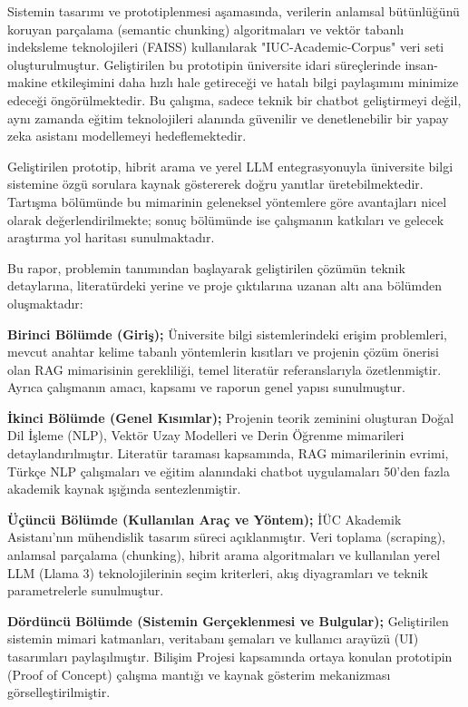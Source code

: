 \documentclass[12pt,a4paper]{report}
\begin{document}
Sistemin tasarımı ve prototiplenmesi aşamasında, verilerin anlamsal bütünlüğünü koruyan parçalama (semantic chunking) algoritmaları ve vektör tabanlı indeksleme teknolojileri (FAISS) kullanılarak "IUC-Academic-Corpus" veri seti oluşturulmuştur. Geliştirilen bu prototipin üniversite idari süreçlerinde insan-makine etkileşimini daha hızlı hale getireceği ve hatalı bilgi paylaşımını minimize edeceği öngörülmektedir. Bu çalışma, sadece teknik bir chatbot geliştirmeyi değil, aynı zamanda eğitim teknolojileri alanında güvenilir ve denetlenebilir bir yapay zeka asistanı modellemeyi hedeflemektedir.

Geliştirilen prototip, hibrit arama ve yerel LLM entegrasyonuyla üniversite bilgi sistemine özgü sorulara kaynak göstererek doğru yanıtlar üretebilmektedir. Tartışma bölümünde bu mimarinin geleneksel yöntemlere göre avantajları nicel olarak değerlendirilmekte; sonuç bölümünde ise çalışmanın katkıları ve gelecek araştırma yol haritası sunulmaktadır.

Bu rapor, problemin tanımından başlayarak geliştirilen çözümün teknik detaylarına, literatürdeki yerine ve proje çıktılarına uzanan altı ana bölümden oluşmaktadır:

\textbf{Birinci Bölümde (Giriş);} Üniversite bilgi sistemlerindeki erişim problemleri, mevcut anahtar kelime tabanlı yöntemlerin kısıtları ve projenin çözüm önerisi olan RAG mimarisinin gerekliliği, temel literatür referanslarıyla özetlenmiştir. Ayrıca çalışmanın amacı, kapsamı ve raporun genel yapısı sunulmuştur.

\textbf{İkinci Bölümde (Genel Kısımlar);} Projenin teorik zeminini oluşturan Doğal Dil İşleme (NLP), Vektör Uzay Modelleri ve Derin Öğrenme mimarileri detaylandırılmıştır. Literatür taraması kapsamında, RAG mimarilerinin evrimi, Türkçe NLP çalışmaları ve eğitim alanındaki chatbot uygulamaları 50'den fazla akademik kaynak ışığında sentezlenmiştir.

\textbf{Üçüncü Bölümde (Kullanılan Araç ve Yöntem);} İÜC Akademik Asistanı'nın mühendislik tasarım süreci açıklanmıştır. Veri toplama (scraping), anlamsal parçalama (chunking), hibrit arama algoritmaları ve kullanılan yerel LLM (Llama 3) teknolojilerinin seçim kriterleri, akış diyagramları ve teknik parametrelerle sunulmuştur.

\textbf{Dördüncü Bölümde (Sistemin Gerçeklenmesi ve Bulgular);} Geliştirilen sistemin mimari katmanları, veritabanı şemaları ve kullanıcı arayüzü (UI) tasarımları paylaşılmıştır. Bilişim Projesi kapsamında ortaya konulan prototipin (Proof of Concept) çalışma mantığı ve kaynak gösterim mekanizması görselleştirilmiştir.
\end{document}
